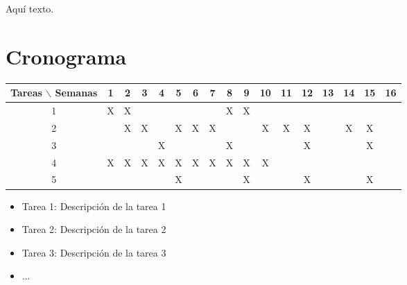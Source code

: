 \documentclass[12pt]{article}
\begin{document}



Aqu\'i texto.

\section{Cronograma}

\begin{table}[htb]
	\begin{tabular}{|c|cccccccccccccccc| }
	\hline
	Tareas $\backslash$ Semanas & 1 & 2 & 3 & 4 & 5 & 6 & 7 & 8 & 9 & 10 & 11 & 12 & 13 & 14 & 15 & 16  \\
	\hline
	1 & X & X &   &   &   &   &   & X & X &   &   &   &   &   &   &   \\
	2 &   & X & X &   & X & X & X &   &   & X & X & X &   & X & X &   \\
	3 &   &   &   & X &   &   &   & X &   &   &   & X &   &   & X &   \\
	4 & X & X & X & X & X & X & X & X & X & X &   &   &   &   &   &   \\
	5 &   &   &   &   & X &   &   &   & X &   &   & X &   &   & X &   \\
	\hline
	\end{tabular}
\end{table}
\vspace{1mm}

\begin{itemize}
	\item Tarea 1: Descripci\'on de la tarea 1
	\item Tarea 2: Descripci\'on de la tarea 2
	\item Tarea 3: Descripci\'on de la tarea 3
	\item ...
\end{itemize}
\end{document}
